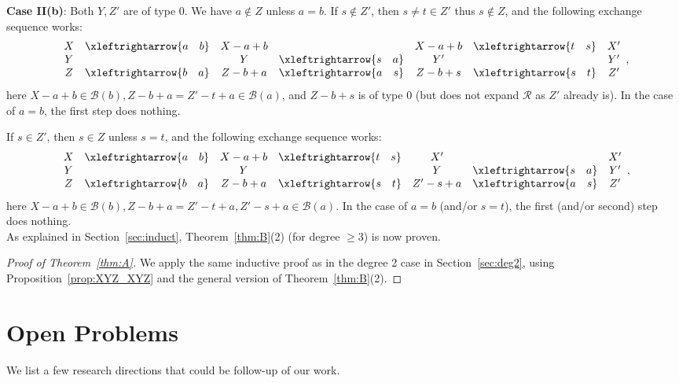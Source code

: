 \documentclass{amsart}
\newcommand{\swap}[2]{\xleftrightarrow{#1 \quad #2}}
\newcommand\Bcal{{\mathcal B}}
\newcommand\Rcal{{\mathcal R}}
\begin{document}
{\bf Case II(b)}: Both $Y,Z'$ are of type 0. We have $a\not\in Z$ unless $a=b$. If $s\not\in Z'$, then $s\neq t\in Z'$ thus $s\not\in Z$, and the following exchange sequence works:
$$
    \begin{array}{c c c c c c c}
        X   & \swap{a}{b} & X - a + b   &              & X - a + b  &      \swap{t}{s} & X'  \\
        Y  &             & Y            & \swap{s}{a}  & Y'               &             & Y'   \\
        Z   & \swap{b}{a} & Z - b + a    & \swap{a}{s}  & Z - b + s        & \swap{s}{t} & Z'  
    \end{array},
$$
here $X-a+b\in\Bcal(b), Z-b+a=Z'-t+a\in\Bcal(a)$, and $Z-b+s$ is of type 0 (but does not expand $\Rcal$ as $Z'$ already is). In the case of $a=b$, the first step does nothing.

If $s\in Z'$, then $s\in Z$ unless $s=t$, and the following exchange sequence works:
$$
    \begin{array}{c c c c c c c}
        X   & \swap{a}{b} & X - a + b & \swap{t}{s}  & X' &             & X' \\
        Y  &             & Y          &              & Y          & \swap{s}{a}  & Y'  \\
        Z   & \swap{b}{a} & Z - b + a & \swap{s}{t}  & Z' - s + a & \swap{a}{s}  & Z' 
    \end{array},
$$
here $X-a+b\in\Bcal(b), Z-b+a=Z'-t+a, Z'-s+a\in\Bcal(a)$. In the case of $a=b$ (and/or $s=t$), the first (and/or second) step does nothing.\\

As explained in Section~\ref{sec:induct}, Theorem~\ref{thm:B}(2) (for degree $\geq 3$) is now proven.

\begin{proof} [Proof of Theorem~\ref{thm:A}]
    We apply the same inductive proof as in the degree 2 case in Section~\ref{sec:deg2}, using Proposition~\ref{prop:XYZ_XYZ} and the general version of Theorem~\ref{thm:B}(2).
\end{proof}

\section{Open Problems}

We list a few research directions that could be follow-up of our work.
\end{document}

